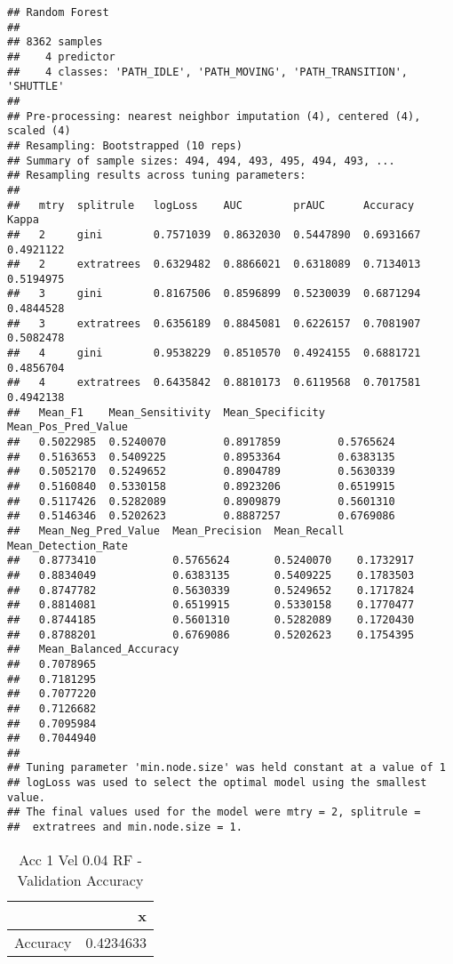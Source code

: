 \documentclass[]{article}
\begin{document}
\begin{verbatim}
## Random Forest 
## 
## 8362 samples
##    4 predictor
##    4 classes: 'PATH_IDLE', 'PATH_MOVING', 'PATH_TRANSITION', 'SHUTTLE' 
## 
## Pre-processing: nearest neighbor imputation (4), centered (4), scaled (4) 
## Resampling: Bootstrapped (10 reps) 
## Summary of sample sizes: 494, 494, 493, 495, 494, 493, ... 
## Resampling results across tuning parameters:
## 
##   mtry  splitrule   logLoss    AUC        prAUC      Accuracy   Kappa    
##   2     gini        0.7571039  0.8632030  0.5447890  0.6931667  0.4921122
##   2     extratrees  0.6329482  0.8866021  0.6318089  0.7134013  0.5194975
##   3     gini        0.8167506  0.8596899  0.5230039  0.6871294  0.4844528
##   3     extratrees  0.6356189  0.8845081  0.6226157  0.7081907  0.5082478
##   4     gini        0.9538229  0.8510570  0.4924155  0.6881721  0.4856704
##   4     extratrees  0.6435842  0.8810173  0.6119568  0.7017581  0.4942138
##   Mean_F1    Mean_Sensitivity  Mean_Specificity  Mean_Pos_Pred_Value
##   0.5022985  0.5240070         0.8917859         0.5765624          
##   0.5163653  0.5409225         0.8953364         0.6383135          
##   0.5052170  0.5249652         0.8904789         0.5630339          
##   0.5160840  0.5330158         0.8923206         0.6519915          
##   0.5117426  0.5282089         0.8909879         0.5601310          
##   0.5146346  0.5202623         0.8887257         0.6769086          
##   Mean_Neg_Pred_Value  Mean_Precision  Mean_Recall  Mean_Detection_Rate
##   0.8773410            0.5765624       0.5240070    0.1732917          
##   0.8834049            0.6383135       0.5409225    0.1783503          
##   0.8747782            0.5630339       0.5249652    0.1717824          
##   0.8814081            0.6519915       0.5330158    0.1770477          
##   0.8744185            0.5601310       0.5282089    0.1720430          
##   0.8788201            0.6769086       0.5202623    0.1754395          
##   Mean_Balanced_Accuracy
##   0.7078965             
##   0.7181295             
##   0.7077220             
##   0.7126682             
##   0.7095984             
##   0.7044940             
## 
## Tuning parameter 'min.node.size' was held constant at a value of 1
## logLoss was used to select the optimal model using the smallest value.
## The final values used for the model were mtry = 2, splitrule =
##  extratrees and min.node.size = 1.
\end{verbatim}

\begin{table}[!h]

\caption{\label{tab:a1v004-rf-params}Acc 1 Vel 0.04 RF - Validation Accuracy}
\centering
\begin{tabular}[t]{lr}
\toprule
  & x\\
\midrule
Accuracy & 0.4234633\\
\bottomrule
\end{tabular}
\end{table}
\end{document}
